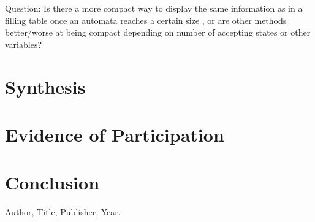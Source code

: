 \documentclass{article}
\theoremstyle{theorem}
\theoremstyle{definition}
\theoremstyle{remark}
\begin{document}
Question: Is there a more compact way to display the same information as in a filling table once an automata reaches a certain size , or are other methods better/worse at being compact depending on number of accepting states or other variables?

\section{Synthesis}

\section{Evidence of Participation}

\section{Conclusion}\label{conclusion}


\begin{thebibliography}{99}
     Author, \href{https://en.wikipedia.org/wiki/LaTeX}{Title}, Publisher, Year.
    \end{thebibliography}
\end{document}
